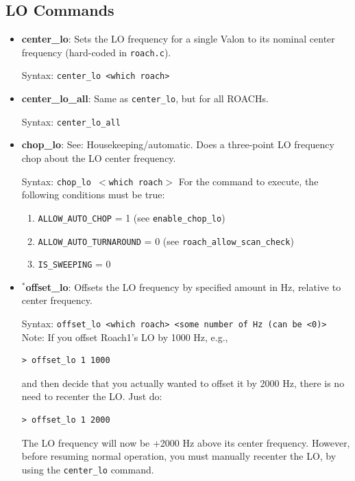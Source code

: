 \subsection{LO Commands}

\begin{itemize}[leftmargin=*,label={}]

\item \textbf{center\_lo}: Sets the LO frequency for a single Valon to its nominal center frequency (hard-coded in \texttt{roach.c}).

Syntax: \texttt{center\_lo <which roach>}

\item \textbf{center\_lo\_all}: Same as \texttt{center\_lo}, but for all ROACHs.

Syntax: \texttt{center\_lo\_all}

\item \textbf{chop\_lo}: See: Housekeeping/automatic. Does a three-point LO frequency chop about the LO center frequency.

Syntax: \texttt{chop\_lo $<$which roach$>$}
For the command to execute, the following conditions must be true:

\begin{enumerate}
\item \texttt{ALLOW\_AUTO\_CHOP} = 1 (see \texttt{enable\_chop\_lo})
\item \texttt{ALLOW\_AUTO\_TURNAROUND} = 0 (see \texttt{roach\_allow\_scan\_check})
\item \texttt{IS\_SWEEPING} = 0
\end{enumerate}

\item$^{*}$\textbf{offset\_lo}: Offsets the LO frequency by specified amount in Hz, relative to center frequency.\

Syntax: \texttt{offset\_lo <which roach> <some number of Hz (can be <0)>}\\
Note: If you offset Roach1’s LO by 1000 Hz, e.g.,
\begin{verbatim}
> offset_lo 1 1000
\end{verbatim}
and then decide that you actually wanted to offset it by 2000 Hz, there is no need to recenter the LO\@. Just do:
\begin{verbatim}
> offset_lo 1 2000
\end{verbatim}
The LO frequency will now be +2000 Hz above its center frequency. However, before resuming normal operation, you must manually recenter the LO, by using the \texttt{center\_lo} command.


\end{itemize}
